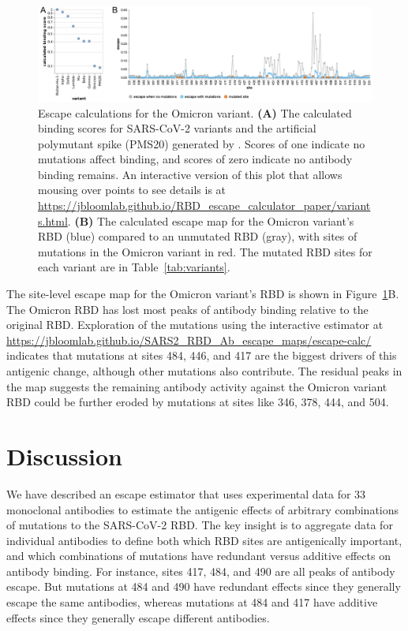 \documentclass[9pt,twocolumn,twoside]{gsajnl_modified}
\begin{document}
\begin{figure}
\includegraphics[width=\linewidth]{figures/Omicron/Omicron.pdf}
\caption{Escape calculations for the Omicron variant.
{\bf (A)} The calculated binding scores for SARS-CoV-2 variants and the artificial polymutant spike (PMS20) generated by \citet{schmidt2021high}.
Scores of one indicate no mutations affect binding, and scores of zero indicate no antibody binding remains.
An interactive version of this plot that allows mousing over points to see details is at \url{https://jbloomlab.github.io/RBD_escape_calculator_paper/variants.html}.
{\bf (B)} The calculated escape map for the Omicron variant's RBD (blue) compared to an unmutated RBD (gray), with sites of mutations in the Omicron variant in red.
The mutated RBD sites for each variant are in Table~\ref{tab:variants}.
}
\label{fig:Omicron}
\end{figure}

The site-level escape map for the Omicron variant's RBD is shown in Figure~\ref{fig:Omicron}B.
The Omicron RBD has lost most peaks of antibody binding relative to the original RBD.
Exploration of the mutations using the interactive estimator at \url{https://jbloomlab.github.io/SARS2_RBD_Ab_escape_maps/escape-calc/} indicates that mutations at sites 484, 446, and 417 are the biggest drivers of this antigenic change, although other mutations also contribute.
The residual peaks in the map suggests the remaining antibody activity against the Omicron variant RBD could be further eroded by mutations at sites like 346, 378, 444, and 504.

\section{Discussion}
We have described an escape estimator that uses experimental data for 33 monoclonal antibodies to estimate the antigenic effects of arbitrary combinations of mutations to the SARS-CoV-2 RBD.
The key insight is to aggregate data for individual antibodies to define both which RBD sites are antigenically important, and which combinations of mutations have redundant versus additive effects on antibody binding.
For instance, sites 417, 484, and 490 are all peaks of antibody escape.
But mutations at 484 and 490 have redundant effects since they generally escape the same antibodies, whereas mutations at 484 and 417 have additive effects since they generally escape different antibodies.
\end{document}
